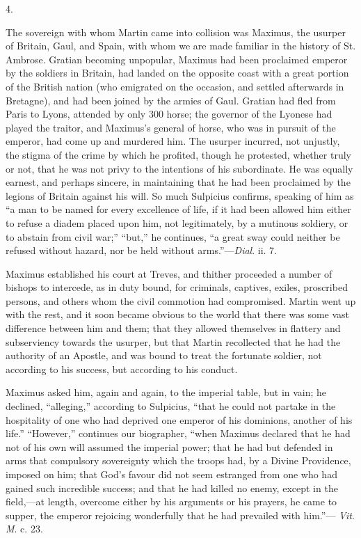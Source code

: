 4.

The sovereign with whom Martin came into collision was
Maximus, the usurper of Britain, Gaul, and Spain, with whom we are
made familiar in the history of St. Ambrose. Gratian becoming
unpopular, Maximus had been proclaimed emperor by the soldiers in
Britain, had landed on the opposite coast with a great portion of the
British nation (who emigrated on the occasion, and settled afterwards
in Bretagne), and had been joined by the armies of Gaul. Gratian had
fled from Paris to Lyons, attended by only 300 horse; the governor of
the Lyonese had played the traitor, and Maximus's general of horse,
who was in pursuit of the emperor, had come up and murdered him. The
usurper incurred, not unjustly, the stigma of the crime by which he
profited, though he protested, whether truly or not, that he was not
privy to the intentions of his subordinate. He was equally earnest,
and perhaps sincere, in maintaining that he had been proclaimed by the
legions of Britain against his will. So much Sulpicius confirms,
speaking of him as ``a man to be named for every excellence of
life, if it had been allowed him either to refuse a diadem placed upon
him, not legitimately, by a mutinous soldiery, or to abstain from
civil war;'' ``but,'' he continues, ``a great sway
could neither be refused without hazard, nor be held without
arms.''—\emph{Dial}. ii. 7.

Maximus established his court at Treves, and thither proceeded a
number of bishops to intercede, as in duty bound, for criminals,
captives, exiles, proscribed persons, and others whom the civil
commotion had compromised. Martin went up with the rest, and it soon
became obvious to the world that there was some vast difference
between him and them; that they allowed themselves in flattery and
subserviency towards the usurper, but that Martin recollected that he
had the authority of an Apostle, and was bound to treat the fortunate
soldier, not according to his success, but according to his
conduct.

Maximus asked him, again and again, to the imperial table, but in
vain; he declined, ``alleging,'' according to Sulpicius,
``that he could not partake in the hospitality of one who had
deprived one emperor of his dominions, another of his life.''
``However,'' continues our biographer, ``when Maximus
declared that he had not of his own will assumed the imperial power;
that he had but defended in arms that compulsory sovereignty which the
troops had, by a Divine Providence, imposed on him; that God's favour
did not seem estranged from one who had gained such incredible
success; and that he had killed no enemy, except in the field,—at
length, overcome either by his arguments or his prayers, he came to
supper, the emperor rejoicing wonderfully that he had prevailed with
him.''— \emph{Vit}. \emph{M}. c. 23.


